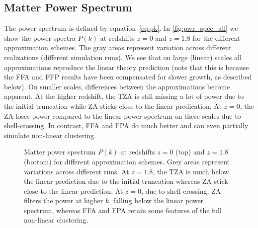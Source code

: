 \subsection{Matter Power Spectrum}
\label{sec:pwr_spec}
The power spectrum is defined by equation~\eqref{eq:pk}. In \autoref{fig:pwr_spec_all} we show the power spectra $P(k)$ at redshifts $z=0$ and $z=1.8$ for the different approximation schemes. The gray areas represent variation across different realizations (different simulation runs). We see that on large (linear) scales all approximations reproduce the linear theory prediction (note that this is because the FFA and FFP results have been compensated for slower growth, as described below). On smaller scales, differences between the approximations become apparent. At the higher redshift, the TZA is still missing a lot of power due to the initial truncation while ZA sticks close to the linear predication. At $z=0$, the ZA loses power compared to the linear power spectrum on these scales due to shell-crossing. In contrast, FFA and FPA do much better and can even partially simulate non-linear clustering.

\begin{figure}[!hbt]
\centering
	\begin{subfigure}{0.9\textwidth}
	\end{subfigure}
	\begin{subfigure}{0.9\textwidth}
	\end{subfigure}
	\begin{subfigure}{0.9\textwidth}
	\end{subfigure}%
	\caption{Matter power spectrum $P(k)$ at redshifts $z=0$ (top) and $z=1.8$ (bottom) for different approximation schemes. Grey areas represent variations across different runs. At $z=1.8$, the TZA is much below the linear prediction due to the initial truncation whereas ZA stick close to the linear prediction. At $z=0$, due to shell-crossing, ZA filters the power at higher $k$, falling below the linear power spectrum, whereas FFA and FPA retain some features of the full non-linear clustering.}
    \label{fig:pwr_spec_all}
\end{figure}

